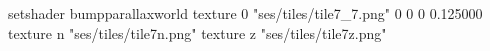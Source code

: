 setshader bumpparallaxworld
texture 0 "ses/tiles/tile7_7.png" 0 0 0 0.125000
texture n "ses/tiles/tile7n.png"
texture z "ses/tiles/tile7z.png"

